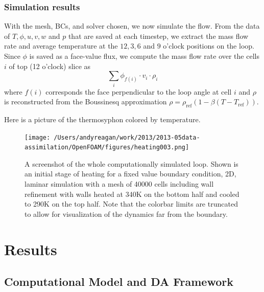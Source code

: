 \documentclass[12pt]{report}
\newcommand{\rhoref}{\rho_{\text{ref}}}
\begin{document}
\subsection{Simulation results}
With the mesh, BCs, and solver chosen, we now simulate the flow.
From the data of $T,\phi,u,v,w$ and $p$ that are saved at each timestep, we extract the mass flow rate and average temperature at the $12,3,6$ and $9$ o'clock positions on the loop.
Since $\phi$ is saved as a face-value flux, we compute the mass flow rate over the cells $i$ of top (12 o'clock) slice as
\begin{equation} \sum _i\phi_{f(i)} \cdot v_i \cdot \rho_i\end{equation}
where $f(i)$ corresponds the face perpendicular to the loop angle at cell $i$ and $\rho$ is reconstructed from the Boussinesq approximation $\rho = \rhoref (1-\beta(T-T_\text{ref}))$.

Here is a picture of the thermosyphon colored by temperature.
\begin{figure}[h!]
  \centering
  \texttt{[image: /Users/andyreagan/work/2013/2013-05data-assimilation/OpenFOAM/figures/heating003.png]}
  \caption[A screenshot of the whole simulated loop]{
  A screenshot of the whole computationally simulated loop.
  Shown is an initial stage of heating for a fixed value boundary condition, 2D, laminar simulation with a mesh of 40000 cells including wall refinement with walls heated at 340K on the bottom half and cooled to 290K on the top half.
  Note that the colorbar limits are truncated to allow for visualization of the dynamics far from the boundary.
  }
  \label{fig:CFDloopSS}
\end{figure}























\chapter{Results}
\chaptermark{} 

\section{Computational Model and DA Framework}
\end{document}
